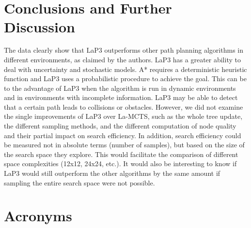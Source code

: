 \documentclass[bibliography=totoc]{scrartcl}
\begin{document}
\section{Conclusions and Further Discussion}
The data clearly show that \ac{LaP3} outperforms other path planning algorithms in different environments, as claimed by the authors.
\ac{LaP3} has a greater ability to deal with uncertainty and stochastic models.
A* requires a deterministic heuristic function and \ac{LaP3} uses a probabilistic procedure to achieve the goal.
This can be to the advantage of \ac{LaP3} when the algorithm is run in dynamic environments and in environments with incomplete information.
\ac{LaP3} may be able to detect that a certain path leads to collisions or obstacles.
However, we did not examine the single improvements of \ac{LaP3} over \ac{La-MCTS}, such as the whole tree update, the different sampling methods, and the different computation of node quality and their partial impact on search efficiency.
In addition, search efficiency could be measured not in absolute terms (number of samples), but based on the size of the search space they explore. 
This would facilitate the comparison of different space complexities (12x12, 24x24, etc.).
It would also be interesting to know if \ac{LaP3} would still outperform the other algorithms by the same amount if sampling the entire search space were not possible.







\section*{Acronyms} 

\begin{acronym}[....]
\end{acronym}



\end{document}
